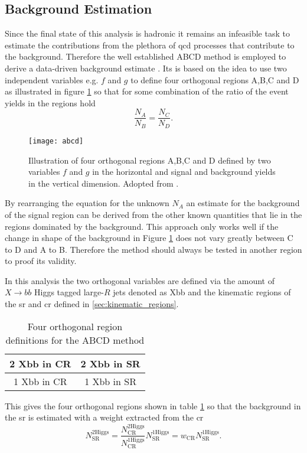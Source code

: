 \subsection{Background Estimation}
Since the final state of this analysis is hadronic it remains an infeasible task to estimate the contributions from the plethora of \ac{qcd} processes that contribute to the background. Therefore the well established ABCD method is employed to derive a data-driven background estimate \citep{buttinger2018background,PhysRevD.103.035021}. Its is based on the idea to use two independent variables e.g. $f$ and $g$ to define four orthogonal regions A,B,C and D as illustrated in figure \ref{fig:abcd} so that for some combination of the ratio of the event yields in the regions hold
\begin{equation}
    \frac{N_A}{N_B}=\frac{N_C}{N_D}.
\end{equation}
\begin{figure}
    \centering
    \texttt{[image: abcd]}
    \caption[]{Illustration of four orthogonal regions A,B,C and D defined by two variables $f$ and $g$ in the horizontal and signal and background yields in the vertical dimension. Adopted from \citep{PhysRevD.103.035021}.}
    \label{fig:abcd}
\end{figure}
By rearranging the equation for the unknown $N_A$ an estimate for the background of the signal region can be derived from the other known quantities that lie in the regions dominated by the background. This approach only works well if the change in shape of the background in Figure \ref{fig:abcd} does not vary greatly between C to D and A to B. Therefore the method should always be tested in another region to proof its validity.

In this analysis the two orthogonal variables are defined via the amount of $X\rightarrow bb$ Higgs tagged large-$R$ jets denoted as Xbb and the kinematic regions of the \ac{sr} and \ac{cr} defined in \ref{sec:kinematic_regions}.
\begin{table}[htbp]
    \centering
    \caption{Four orthogonal region definitions for the ABCD method}
    \begin{tabular}{|c|c|}
        \hline
        2 Xbb in CR & 2 Xbb in SR \\ \hline
        1 Xbb in CR & 1 Xbb in SR \\ \hline
    \end{tabular}
    \label{tab:abcd}
\end{table}
This gives the four orthogonal regions shown in table \ref{tab:abcd} so that the background in the \ac{sr} is estimated with a weight extracted from the \ac{cr}
\begin{equation}
    N_\text{SR}^\text{2Higgs}=\frac{N_\text{CR}^\text{2Higgs}}{N_\text{CR}^\text{1Higgs}} N_\text{SR}^\text{1Higgs} = w_\text{CR} N_\text{SR}^\text{1Higgs}.
\end{equation}


